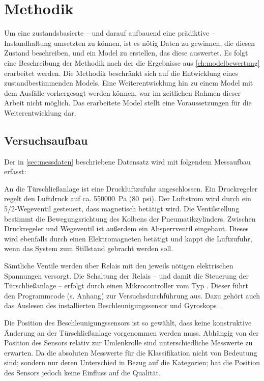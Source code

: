 \chapter{Methodik}
\label{ch:methodik}
Um eine zustandsbasierte -- und darauf aufbauend eine prädiktive -- Instandhaltung umsetzten zu können, ist es nötig Daten zu gewinnen, die diesen Zustand beschreiben, und ein Model zu erstellen, das diese auswertet. Es folgt eine Beschreibung der Methodik nach der die Ergebnisse aus \cref{ch:modelbewertung} erarbeitet werden. Die Methodik beschränkt sich auf die Entwicklung eines zustandbestimmenden Models. Eine Weiterentwicklung hin zu einem Model mit dem Ausfälle vorhergesagt werden können, war im zeitlichen Rahmen dieser Arbeit nicht möglich. Das erarbeitete Model stellt eine Voraussetzungen für die Weiterentwicklung dar. 
\section{Versuchsaufbau}
\label{sec:versuchsaufbau}
Der in \cref{sec:messdaten} beschriebene Datensatz wird mit folgendem Messaufbau erfasst:

An die Türschließanlage ist eine Druckluftzufuhr angeschlossen. Ein Druckregeler regelt den Luftdruck auf ca. \SI{550000}{\pascal} (\SI{80}{psi}). Der Luftstrom wird durch ein 5/2-Wegeventil gesteuert, dass magnetisch betätigt wird. Die Ventilstellung bestimmt die Bewegungsrichtung des Kolbens der Pneumatikzylinders. Zwischen Druckregeler und Wegeventil ist außerdem ein Absperrventil eingebaut. Dieses wird ebenfalls durch einen Elektromagneten betätigt und kappt die Luftzufuhr, wenn das System zum Stillstand gebracht werden soll.

Sämtliche Ventile werden über Relais mit den jeweils nötigen elektrischen Spannungen versorgt. Die Schaltung der Relais -- und damit die Steuerung der Türschließanlage -- erfolgt durch einen Mikrocontroller vom Typ . Dieser führt den Programmcode (s. Anhang) zur Versuchsdurchführung aus.  Dazu gehört auch das Auslesen des installierten Beschleunigungssensor und Gyroskops . 

Die Position des Beschleunigungssensors ist so gewählt, dass keine konstruktive Änderung an der Türschließanlage vorgenommen werden muss. Abhängig von der Position des Sensors relativ zur Umlenkrolle sind unterschiedliche Messwerte zu erwarten. Da die absoluten Messwerte für die Klassifikation nicht von Bedeutung sind; sondern nur deren Unterschied in Bezug auf die Kategorien; hat die Position des Sensors jedoch keine Einfluss auf die Qualität.


